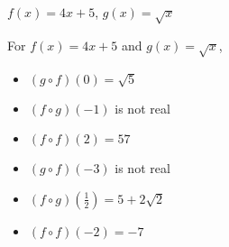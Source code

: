 {$f(x) = 4x+5$, $g(x) = \sqrt{x}$}
{ For $f(x) = 4x+5$ and $g(x) = \sqrt{x}$,
\begin{multicols}{2}

\begin{itemize}

\item  $(g\circ f)(0) = \sqrt{5}$

\item  $(f\circ g)(-1)$ is not real

\item  $(f \circ f)(2) = 57$

\item  $(g\circ f)(-3)$ is not real

\item  $(f\circ g)\left(\frac{1}{2}\right) = 5+2\sqrt{2}$

\item  $(f \circ f)(-2) = -7$

\end{itemize}

\end{multicols}}